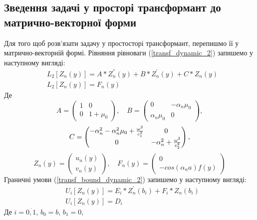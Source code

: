 \subsection{Зведення задачі у просторі трансформант до матрично-векторної форми}
Для того щоб розв'язати задачу у простосторі трансформант, перепишмо її у матрично-векторній формі.
Рівняння рівноваги (\ref{transf_dynamic_2}) запишемо у наступному вигляді:
\begin{align}\label{transf_mat_dynamic_2}
    &L_2\left[ Z_n(y) \right] = A * Z_n^{''}(y) + B * Z_n^{'}(y) + C * Z_n(y) \nonumber \\
    &L_2\left[ Z_n(y) \right] = F_n(y)
\end{align}
Де
\begin{equation*}
    A = \begin{pmatrix}
        1 & 0 \\
        0 & 1 + \mu_0
    \end{pmatrix}, \quad
    B = \begin{pmatrix}
        0 & -\alpha_n \mu_0 \\
        \alpha_n \mu_0 & 0
    \end{pmatrix},
\end{equation*}
\begin{equation*}
    \centering
    C = \begin{pmatrix}
        -\alpha_n^2 -\alpha_n^2 \mu_0 + \frac{\omega^2}{c_1^2} & 0 \\
        0 & -\alpha_n^2 + \frac{\omega^2}{c_2^2}
    \end{pmatrix},
\end{equation*}
\begin{equation*}
    Z_n(y) = \begin{pmatrix}
        u_n(y) \\
        v_n(y)
    \end{pmatrix}, \quad 
    F_n(y) = \begin{pmatrix}
        0 \\
        - cos(\alpha_n a) f(y)
    \end{pmatrix}
\end{equation*}
Граничні умови (\ref{transf_bound_dynamic_2}) запишемо у наступному вигляді:
\begin{align}\label{transf_bound_mat_dynamic_2}
    &U_i\left[ Z_n(y) \right] = E_i * Z_n^{'}(b_i) + F_i * Z_n(b_i) \nonumber \\
    & U_i\left[ Z_n(y) \right] = D_i
\end{align}
Де $i = \overline{0, 1}$, $b_0 = b$, $b_1 = 0$,
